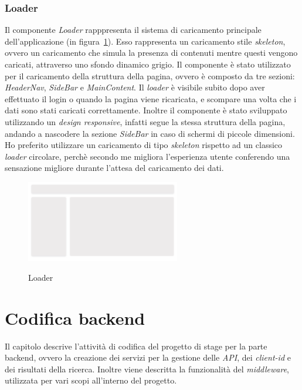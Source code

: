 \subsubsection{Loader}\label{subsubsec:loader}
Il componente \textit{Loader} rapppresenta il sistema di caricamento principale dell'applicazione (in figura~\ref{fig:loader}).
Esso rappresenta un caricamento stile \textit{skeleton}, ovvero un caricamento che simula la presenza di contenuti mentre questi vengono caricati, attraverso 
uno sfondo dinamico grigio.
Il componente è stato utilizzato per il caricamento della struttura della pagina, ovvero è composto da tre sezioni: \textit{HeaderNav}, \textit{SideBar} e
\textit{MainContent}. Il \textit{loader} è visibile subito dopo aver effettuato il login o quando la pagina viene ricaricata, e scompare una volta che i dati sono stati caricati correttamente.
Inoltre il componente è stato sviluppato utilizzando un \textit{design responsive}, infatti segue la stessa struttura della pagina, andando a nascodere la sezione 
\textit{SideBar} in caso di schermi di piccole dimensioni.
Ho preferito utilizzare un caricamento di tipo \textit{skeleton} rispetto ad un classico \textit{loader} circolare, perchè secondo me migliora l'esperienza utente 
conferendo una sensazione migliore durante l'attesa del caricamento dei dati.

\begin{figure}[ht]
  \centering
  \includegraphics[width=0.6\textwidth, alt={Skeleton loader di caricamento principale dell'applicazione}]{images/frontend/Loader.jpg}
  \caption{Loader}\label{fig:loader}
\end{figure}
\pagebreak

\section{Codifica backend}\label{sec:codifica-backend}
Il capitolo descrive l'attività di codifica del progetto di stage per la parte backend, ovvero la creazione 
dei servizi per la gestione delle \textit{API}, dei \textit{client-id} e dei risultati della ricerca.
Inoltre viene descritta la funzionalità del \textit{middleware}, utilizzata per vari scopi all'interno del progetto.

